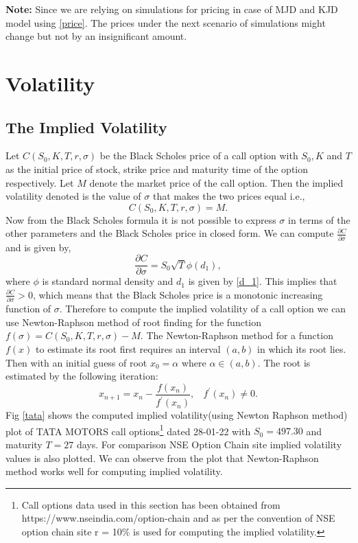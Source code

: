 \documentclass[12pt]{report}
\begin{document}
\textbf{Note:} Since we are relying on simulations for pricing in case of MJD and KJD model using \ref{price}. The prices under the next scenario of simulations might change but not by an insignificant amount.




\chapter{Volatility}

\section{The Implied Volatility}
Let $C(S_{0},K,T,r,\sigma)$ be the Black Scholes price of a call option with $S_0,K$ and $T$ as the initial price of stock, strike price and maturity time of the option respectively. Let $M$ denote the market price of the call option. Then the implied volatility denoted is the value of $\sigma$ that makes the two prices equal i.e.,
\begin{equation}
    C(S_{0},K,T,r,\sigma) = M.
\end{equation}
Now from the Black Scholes formula it is not possible to express $\sigma$ in terms of the other parameters and the Black Scholes price in closed form. We can compute $\frac{\partial C}{\partial \sigma}$ and is given by,
\begin{equation}
    \frac{\partial C}{\partial \sigma} = S_0 \sqrt{T} \phi(d_1),
\end{equation}
where $\phi$ is standard normal density and $d_1$ is given by \ref{d_1}.  This implies that $\frac{\partial C}{\partial \sigma} > 0$, which means that the Black Scholes price is a monotonic increasing function of $\sigma$. Therefore to compute the implied volatility of a call option we can use Newton-Raphson method of root finding for the function $f(\sigma) = C(S_{0},K,T,r,\sigma) - M$. The Newton-Raphson method for a function $f(x)$ to estimate its root first requires an interval $(a,b)$ in which its root lies. Then with an initial guess of root $x_0 = \alpha$ where $\alpha \in (a,b)$. The root is estimated by the following iteration:
\begin{equation}
    x_{n+1} = x_{n} - \frac{f(x_n)}{f^{'}(x_n)} , ~~~~f^{'}(x_n) \neq 0. 
\end{equation}
Fig \ref{tata} shows the computed implied volatility(using Newton Raphson method) plot of TATA MOTORS call options\footnote{Call options data used in this section has been obtained from https://www.nseindia.com/option-chain and as per the convention of NSE option chain site r = 10\% is used for computing the implied volatility.} dated 28-01-22 with $S_0 = 497.30$ and maturity $T=27$ days. For comparison NSE Option Chain site implied volatility values is also plotted. We can observe from the plot that Newton-Raphson method works well for computing implied volatility.    
\end{document}
